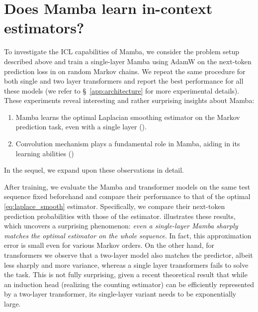 
\section{Does Mamba learn in-context estimators?}
\label{sec:empirical}

To investigate the ICL capabilities of Mamba, we consider the problem setup described above and train a single-layer Mamba using AdamW on the next-token prediction loss in  on random Markov chains. We repeat the same procedure for both single and two layer transformers and report the best performance for all these models (we refer to \S~\ref{app:architecture} for more experimental details). These experiments reveal interesting and rather surprising insights about Mamba:

\begin{enumerate}
    \item Mamba learns the optimal Laplacian smoothing estimator on the Markov prediction task, even with a single layer (). 
    \item Convolution mechanism plays a fundamental role in Mamba, aiding in its learning abilities ()
\end{enumerate}

In the sequel, we expand upon these observations in detail. 

 After training, we evaluate the Mamba and transformer models on the same test sequence fixed beforehand and compare their performance to that of the optimal \ref{eq:laplace_smooth} estimator. Specifically, we compare their next-token prediction probabilities with those of the \adbeta estimator.  illustrates these results, which uncovers a surprising phenomenon: \emph{even a single-layer Mamba sharply matches the optimal estimator on the whole sequence}. In fact, this approximation error is small even for various Markov orders. On the other hand, for transformers we observe that a two-layer model also matches the predictor, albeit less sharply and more variance, whereas a single layer transformers fails to solve the task. This is not fully surprising, given a recent theoretical result \cite{sanford2024onelayer} that while an induction head (realizing the counting estimator) can be efficiently represented by a two-layer transformer, its single-layer variant needs to be exponentially large.

